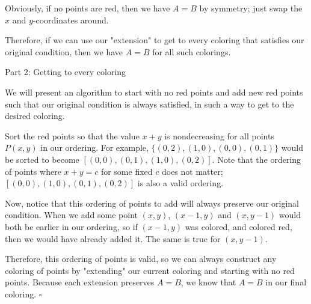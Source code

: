 \begin{solution}
    Obviously, if no points are red, then we have $A=B$ by symmetry; just swap the $x$ and $y$-coordinates around.
    
    Therefore, if we can use our "extension" to get to every coloring that satisfies our original condition, then we have $A=B$ for all such colorings.
    
    \large Part 2: Getting to every coloring \small
    
    We will present an algorithm to start with no red points and add new red points such that our original condition is always satisfied, in such a way to get to the desired coloring.
    
    Sort the red points so that the value $x+y$ is nondecreasing for all points $P(x,y)$ in our ordering. For example, $\{(0,2),(1,0),(0,0),(0,1)\}$ would be sorted to become $[(0,0),(0,1),(1,0),(0,2)]$. Note that the ordering of points where $x+y=c$ for some fixed $c$ does not matter; $[(0,0),(1,0),(0,1),(0,2)]$ is also a valid ordering.
    
    Now, notice that this ordering of points to add will always preserve our original condition. When we add some point $(x,y)$, $(x-1,y)$ and $(x,y-1)$ would both be earlier in our ordering, so if $(x-1,y)$ was colored, and colored red, then we would have already added it. The same is true for $(x,y-1)$.
    
    Therefore, this ordering of points is valid, so we can always construct any coloring of points by "extending" our current coloring and starting with no red points. Because each extension preserves $A=B$, we know that $A=B$ in our final coloring. $\square$
\end{solution}
